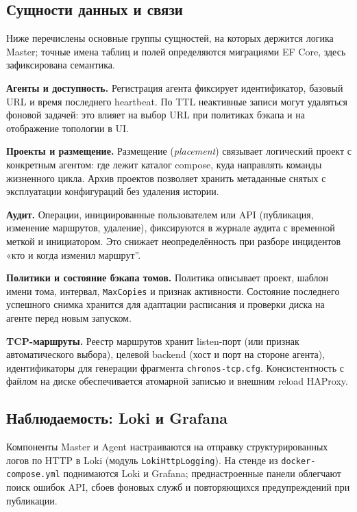 \subsection{Сущности данных и связи}

Ниже перечислены основные группы сущностей, на которых держится логика Master; точные имена таблиц и полей определяются миграциями EF Core, здесь зафиксирована семантика.

\textbf{Агенты и доступность.} Регистрация агента фиксирует идентификатор, базовый URL и время последнего heartbeat. По TTL неактивные записи могут удаляться фоновой задачей: это влияет на выбор URL при политиках бэкапа и на отображение топологии в UI.

\textbf{Проекты и размещение.} Размещение (\emph{placement}) связывает логический проект с конкретным агентом: где лежит каталог compose, куда направлять команды жизненного цикла. Архив проектов позволяет хранить метаданные снятых с эксплуатации конфигураций без удаления истории.

\textbf{Аудит.} Операции, инициированные пользователем или API (публикация, изменение маршрутов, удаление), фиксируются в журнале аудита с временной меткой и инициатором. Это снижает неопределённость при разборе инцидентов «кто и когда изменил маршрут''.

\textbf{Политики и состояние бэкапа томов.} Политика описывает проект, шаблон имени тома, интервал, \texttt{MaxCopies} и признак активности. Состояние последнего успешного снимка хранится для адаптации расписания и проверки диска на агенте перед новым запуском.

\textbf{TCP-маршруты.} Реестр маршрутов хранит listen-порт (или признак автоматического выбора), целевой backend (хост и порт на стороне агента), идентификаторы для генерации фрагмента \texttt{chronos-tcp.cfg}. Консистентность с файлом на диске обеспечивается атомарной записью и внешним reload HAProxy.

\subsection{Наблюдаемость: Loki и Grafana}

Компоненты Master и Agent настраиваются на отправку структурированных логов по HTTP в Loki (модуль \texttt{LokiHttpLogging}). На стенде из \texttt{docker-compose.yml} поднимаются Loki и Grafana; преднастроенные панели облегчают поиск ошибок API, сбоев фоновых служб и повторяющихся предупреждений при публикации.


